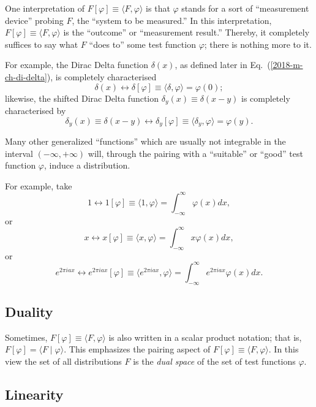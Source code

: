 One interpretation of
$F[\varphi ]\equiv \langle F , \varphi \rangle $
is that  $\varphi$ stands for a sort of ``measurement device'' probing
$F$, the ``system to be measured.''
In this interpretation,
$F[\varphi ]\equiv \langle F , \varphi \rangle $
is the ``outcome'' or ``measurement result.''
Thereby, it completely suffices to say what $F$ ``does to'' some test function $\varphi$; there is nothing more to it.

{
\color{blue}
\bexample
For example, the Dirac Delta function $\delta(x)$, as defined later in Eq.~(\ref{2018-m-ch-di-delta}), is completely characterised
$$\delta(x)  \longleftrightarrow \delta [\varphi ]\equiv \langle \delta , \varphi \rangle =\varphi (0);$$
likewise,
the shifted Dirac Delta function $\delta_y(x)\equiv \delta (x-y)$ is completely characterised by
$$\delta_y (x) \equiv \delta(x-y) \longleftrightarrow \delta_y
[\varphi ]\equiv \langle \delta_y , \varphi \rangle =\varphi (y).$$
\eexample
}

Many other generalized ``functions'' which are usually not integrable in the interval
$( -\infty , +\infty )$ will, through the pairing with a
``suitable'' or ``good'' test function $\varphi$,
induce a distribution.

{
\color{blue}
\bexample
For example, take
$$1 \longleftrightarrow 1 [\varphi ]\equiv \langle 1 , \varphi \rangle
=\int_{-\infty}^\infty
\varphi (x)
dx  , $$
or
$$x \longleftrightarrow x [\varphi ]\equiv \langle x , \varphi \rangle =\int_{-\infty}^\infty
x\varphi (x)
dx,$$
or
$$e^{2\pi i ax} \longleftrightarrow e^{2\pi i ax} [\varphi ]\equiv \langle e^{2\pi i ax}  ,
\varphi \rangle
=\int_{-\infty}^\infty
e^{2\pi i ax} \varphi (x)
dx  .$$
\eexample
}

\subsection{Duality}

Sometimes, $F[\varphi ]\equiv \langle F , \varphi \rangle $   is also written in a scalar product notation; that is,
$F[\varphi] =\langle F \mid \varphi \rangle$.
This emphasizes the pairing aspect of $F[\varphi ]\equiv \langle F , \varphi \rangle $.
In this view the set of all distributions $F$ is the {\em dual space} of the set of test functions $\varphi$.


\subsection{Linearity}


